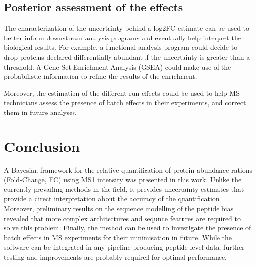 \subsection{Posterior assessment of the effects}

The characterization of the uncertainty behind a \ac{log2FC} estimate can be used to better inform downstream analysis programs and eventually help interpret the biological results. For example, a functional analysis program could decide to drop proteins declared differentially abundant if the uncertainty is greater than a threshold. A Gene Set Enrichment Analysis (\ac{GSEA}) could make use of the probabilistic information to refine the results of the enrichment.

Moreover, the estimation of the different run effects could be used to help \ac{MS} technicians assess the presence of batch effects in their experiments, and correct them in future analyses.

\section{Conclusion}

A Bayesian framework for the relative quantification of protein abundance rations (Fold-Change, FC) using \ac{MS1} intensity was presented in this work. Unlike the currently prevailing methods in the field, it provides uncertainty estimates that provide a direct interpretation about the accuracy of the quantification. Moreover, preliminary results on the sequence modelling of the peptide bias revealed that more complex architectures and sequnce features are required to solve this problem. Finally, the method can be used to investigate the presence of batch effects in \ac{MS} experiments for their minimisation in future. While the software can be integrated in any pipeline producing peptide-level data, further testing and improvements are probably required for optimal performance.
